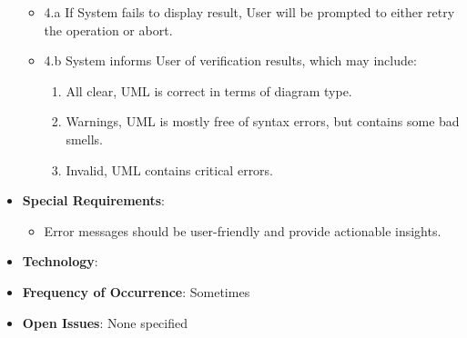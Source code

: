\documentclass[12pt]{article}
\begin{document}
\begin{itemize}
\begin{itemize}
        \item 4.a If System fails to display result, User will be prompted to either retry the operation or abort.
        \item 4.b System informs User of verification results, which may include:
        \begin{enumerate}
            \item All clear, UML is correct in terms of diagram type.
            \item Warnings, UML is mostly free of syntax errors, but contains some bad smells\texttrademark.
            \item Invalid, UML contains critical errors.
        \end{enumerate}
    \end{itemize}
    \item \textbf{Special Requirements}:
    \begin{itemize}
        \item Error messages should be user-friendly and provide actionable insights.
    \end{itemize}
    \item \textbf{Technology}: 
    \item \textbf{Frequency of Occurrence}: Sometimes
    \item \textbf{Open Issues}: None specified
\end{itemize}
\end{document}
